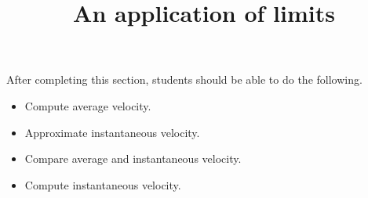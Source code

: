 \documentclass{ximera}
\title{An application of limits}
\begin{document}
\begin{abstract}
\end{abstract}

\maketitle

\begin{sectionOutcomes}

After completing this section, students should be able to do the following.

\begin{itemize}
\item Compute average velocity.
\item Approximate instantaneous velocity.
\item Compare average and instantaneous velocity.
\item Compute instantaneous velocity.
\end{itemize}

\end{sectionOutcomes}
\end{document}
